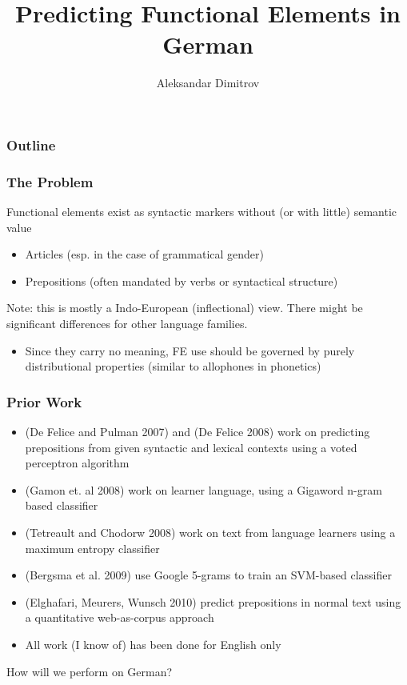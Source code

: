 \documentclass{beamer}
\author{Aleksandar Dimitrov}
\title{Predicting Functional Elements in German}
\begin{document}
\begin{frame}
\titlepage
\end{frame}

\begin{frame}
\frametitle{Outline}
\tableofcontents
\end{frame}

\begin{frame}
\frametitle{The Problem}
Functional elements exist as syntactic markers without (or with little) semantic
value
\begin{itemize}
\item Articles (esp. in the case of grammatical gender)
\item Prepositions (often mandated by verbs or syntactical structure)
\end{itemize}
{\small Note: this is mostly a Indo-European (inflectional) view. There might be
significant differences for other language families.}
\begin{itemize}
\item Since they carry no meaning, FE use should be governed by purely
distributional properties (similar to allophones in phonetics)
\end{itemize}
\end{frame}

\begin{frame}
\frametitle{Prior Work}

\begin{itemize}
\item (De Felice and Pulman 2007) and (De Felice 2008) work on predicting prepositions from given
syntactic and lexical contexts using a voted perceptron algorithm
\item (Gamon et. al 2008) work on learner language, using a Gigaword n-gram
based classifier
\item (Tetreault and Chodorw 2008) work on text from language learners using a
maximum entropy classifier
\item (Bergsma et al. 2009) use Google 5-grams to train an SVM-based
classifier\pause
\item (Elghafari, Meurers, Wunsch 2010) predict prepositions in normal text using
a quantitative web-as-corpus approach
\item All work (I know of) has been done for English only
\end{itemize}
How will we perform on German?
\end{frame}
\end{document}
